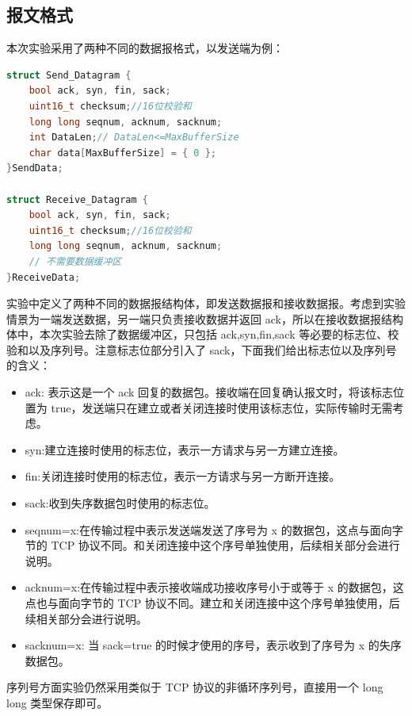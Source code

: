 \documentclass[UTF8,a4paper,10pt]{ctexart}
\begin{document}
\subsection{报文格式}
本次实验采用了两种不同的数据报格式，以发送端为例：
\begin{lstlisting}[frame=trbl,language={C++}]
struct Send_Datagram {
    bool ack, syn, fin, sack;
    uint16_t checksum;//16位校验和
    long long seqnum, acknum, sacknum;
    int DataLen;// DataLen<=MaxBufferSize
    char data[MaxBufferSize] = { 0 };
}SendData;

struct Receive_Datagram {
    bool ack, syn, fin, sack;
    uint16_t checksum;//16位校验和
    long long seqnum, acknum, sacknum;
    // 不需要数据缓冲区
}ReceiveData;
\end{lstlisting}\par
实验中定义了两种不同的数据报结构体，即发送数据报和接收数据报。考虑到实验情景为一端发送数据，另一端只负责接收数据并返回 ack，所以在接收数据报结构体中，本次实验去除了数据缓冲区，只包括 ack,syn,fin,sack 等必要的标志位、校验和以及序列号。注意标志位部分引入了 sack，下面我们给出标志位以及序列号的含义：
\begin{itemize}
    \item ack: 表示这是一个 ack 回复的数据包。接收端在回复确认报文时，将该标志位置为 true，发送端只在建立或者关闭连接时使用该标志位，实际传输时无需考虑。
    \item syn:建立连接时使用的标志位，表示一方请求与另一方建立连接。
    \item fin:关闭连接时使用的标志位，表示一方请求与另一方断开连接。
    \item sack:收到失序数据包时使用的标志位。
    \item seqnum=x:在传输过程中表示发送端发送了序号为 x 的数据包，这点与面向字节的 TCP 协议不同。和关闭连接中这个序号单独使用，后续相关部分会进行说明。
    \item acknum=x:在传输过程中表示接收端成功接收序号小于或等于 x 的数据包，这点也与面向字节的 TCP 协议不同。建立和关闭连接中这个序号单独使用，后续相关部分会进行说明。
    \item sacknum=x: 当 sack=true 的时候才使用的序号，表示收到了序号为 x 的失序数据包。
\end{itemize}\par
序列号方面实验仍然采用类似于 TCP 协议的非循环序列号，直接用一个 long long 类型保存即可。
\end{document}
